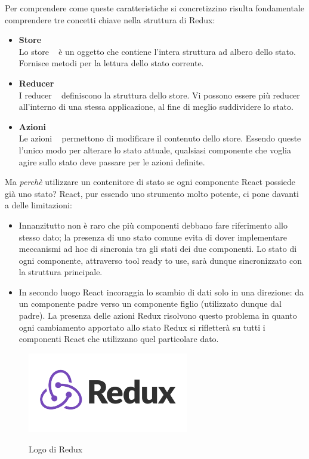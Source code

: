 Per comprendere come queste caratteristiche si concretizzino risulta fondamentale comprendere tre concetti chiave nella struttura di Redux:
\begin{itemize}
  \item \textbf{Store}\\
  Lo store ~\cite{store_redux} è un oggetto che contiene l'intera struttura ad albero dello stato.\newline
  Fornisce metodi per la lettura dello stato corrente.
  \item \textbf{Reducer}\\
  I reducer ~\cite{reducer_redux} definiscono la struttura dello store.\newline
  Vi possono essere più reducer all'interno di una stessa applicazione, al fine di meglio suddividere lo stato.
  \item \textbf{Azioni}\\
  Le azioni ~\cite{azioni_redux} permettono di modificare il contenuto dello store.\newline
  Essendo queste l'unico modo per alterare lo stato attuale, qualsiasi componente che voglia agire sullo stato deve passare per le azioni definite.
\end{itemize}
Ma \emph{perchè} utilizzare un contenitore di stato se ogni componente React possiede già uno stato?
React, pur essendo uno strumento molto potente, ci pone davanti a delle limitazioni:
\begin{itemize}
  \item
  Innanzitutto non è raro che più componenti debbano fare riferimento allo stesso dato; la presenza di uno stato comune evita di dover implementare meccanismi ad hoc di sincronia tra gli stati dei due componenti.\newline
  Lo stato di ogni componente, attraverso tool ready to use, sarà dunque sincronizzato con la struttura principale.
  \item
  In secondo luogo React incoraggia lo scambio di dati solo in una direzione: da un componente padre verso un componente figlio (utilizzato dunque dal padre).\newline
  La presenza delle azioni Redux risolvono questo problema in quanto ogni cambiamento apportato allo stato Redux si rifletterà su tutti i componenti React che utilizzano quel particolare dato.
\end{itemize}
\begin{figure}[H]
    \caption{Logo di Redux ~\cite{redux:online}}
    \centering
    \includegraphics[width=70mm]{img/logos/redux_logo.png}
    \label{fig:redux_logo}
\end{figure}

